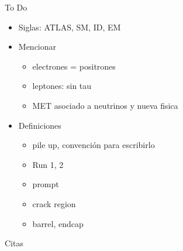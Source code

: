 
{\LARGE To Do}

\begin{itemize}
	\item Siglas: ATLAS, SM, ID, EM
	\item Mencionar
	\begin{itemize}
		\item electrones = positrones
		\item leptones: sin tau
		\item MET asociado a neutrinos y nueva fisica
	\end{itemize}
	\item Definiciones
	\begin{itemize}
		\item pile up, convención para escribirlo
		\item Run 1, 2
		\item prompt
		\item crack region
		\item barrel, endcap
	\end{itemize}
\end{itemize}


\vspace{2cm}


{\LARGE Citas}

